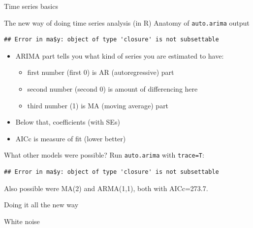 \documentclass[ignorenonframetext,]{beamer}
\newenvironment{Shaded}{\begin{snugshade}}{\end{snugshade}}
\newcommand{\DataTypeTok}[1]{\textcolor[rgb]{0.13,0.29,0.53}{#1}}
\newcommand{\KeywordTok}[1]{\textcolor[rgb]{0.13,0.29,0.53}{\textbf{#1}}}
\newcommand{\NormalTok}[1]{#1}
\newcommand{\OperatorTok}[1]{\textcolor[rgb]{0.81,0.36,0.00}{\textbf{#1}}}
\providecommand{\tightlist}{%
  \setlength{\itemsep}{0pt}\setlength{\parskip}{0pt}}
\begin{document}
\begin{frame}[fragile]{Time series basics}
\begin{block}{The new way of doing time series analysis (in R)}
Anatomy of \texttt{auto.arima} output

\begin{Shaded}
\end{Shaded}

\begin{verbatim}
## Error in ma$y: object of type 'closure' is not subsettable
\end{verbatim}

\begin{itemize}
\tightlist
\item
  ARIMA part tells you what kind of series you are estimated to have:

  \begin{itemize}
  \tightlist
  \item
    first number (first 0) is AR (autoregressive) part
  \item
    second number (second 0) is amount of differencing here
  \item
    third number (1) is MA (moving average) part
  \end{itemize}
\item
  Below that, coefficients (with SEs)
\item
  AICc is measure of fit (lower better)
\end{itemize}

What other models were possible? Run \texttt{auto.arima} with
\texttt{trace=T}:

\begin{Shaded}
\end{Shaded}

\begin{verbatim}
## Error in ma$y: object of type 'closure' is not subsettable
\end{verbatim}

Also possible were MA(2) and ARMA(1,1), both with AICc=273.7.

\end{block}

\begin{block}{Doing it all the new way}

\begin{block}{White noise}


\end{block}
\end{block}
\end{frame}
\end{document}
